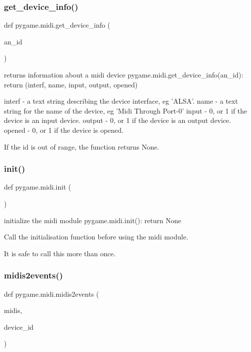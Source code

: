 \subsubsection{\texorpdfstring{get\+\_\+device\+\_\+info()}{get\_device\_info()}}
{\footnotesize\ttfamily def pygame.\+midi.\+get\+\_\+device\+\_\+info (\begin{DoxyParamCaption}\item[{}]{an\+\_\+id }\end{DoxyParamCaption})}

\begin{DoxyVerb}returns information about a midi device
pygame.midi.get_device_info(an_id): return (interf, name, input, output, opened)

interf - a text string describing the device interface, eg 'ALSA'.
name - a text string for the name of the device, eg 'Midi Through Port-0'
input - 0, or 1 if the device is an input device.
output - 0, or 1 if the device is an output device.
opened - 0, or 1 if the device is opened.

If the id is out of range, the function returns None.
\end{DoxyVerb}
 \mbox{\label{namespacepygame_1_1midi_a2272bbd4600ff1706570238796d25eb9}} 
\subsubsection{\texorpdfstring{init()}{init()}}
{\footnotesize\ttfamily def pygame.\+midi.\+init (\begin{DoxyParamCaption}{ }\end{DoxyParamCaption})}

\begin{DoxyVerb}initialize the midi module
pygame.midi.init(): return None

Call the initialisation function before using the midi module.

It is safe to call this more than once.
\end{DoxyVerb}
 \mbox{\label{namespacepygame_1_1midi_a7623e211da0629c5520b3b0384445104}} 
\subsubsection{\texorpdfstring{midis2events()}{midis2events()}}
{\footnotesize\ttfamily def pygame.\+midi.\+midis2events (\begin{DoxyParamCaption}\item[{}]{midis,  }\item[{}]{device\+\_\+id }\end{DoxyParamCaption})}

